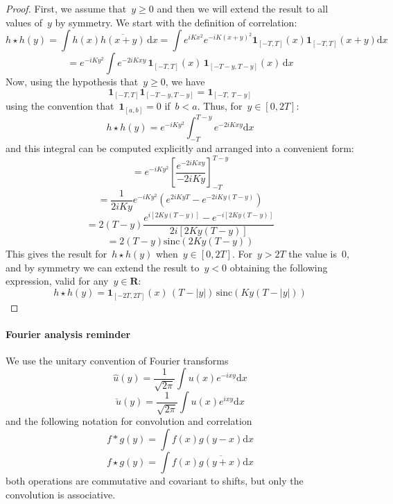 \documentclass[a4paper]{article}           %
\newcommand{\1}{\mathbf{1}}
\newcommand{\R}{\mathbf{R}}
\newcommand{\ud}{\mathrm{d}}
\newcommand{\abs}[1]{\left|#1\right|}
\newcommand{\paren}[1]{\left(#1\right)}
\begin{document}
\begin{proof}
	First, we assume that~$y\ge0$ and then we will extend the result to all
	values of~$y$ by symmetry.  We start with the definition of correlation:
	\[
		h\star h (y)
		=
		\int
		h(x)\overline{h(x+y)}\,\ud x
		=
		\int
		e^{iKx^2}
		e^{-iK\paren{x+y}^2}
		\1_{[-T,T]} (x)
		\1_{[-T,T]} (x+y)
		\ud x
	\]
	\[
		=
		e^{-iKy^2}
		\int
		e^{-2iKxy}
		\,
		\1_{[-T,T]} (x)
		\,
		\1_{[-T-y,T-y]} (x)
		\,
		\ud x
	\]
	Now, using the hypothesis that~$y\ge0$, we have
	\[
		\1_{[-T,T]} \1_{[-T-y,T-y]}
		=
		\1_{[-T,\ T-y]}
	\]
	using the convention that~$\1_{[a,b]}=0$ if~$b<a$.
	Thus, for~$y\in[0,2T]$:
	\[
		h\star h (y)
		=
		e^{-iKy^2}
		\int_{-T}^{T-y}
		e^{-2iKxy}
		\ud x
	\]
	and this integral can be computed explicitly and arranged into a convenient
	form:
	\[
		=
		e^{-iKy^2}
		\left[
			\frac{\displaystyle e^{-2iKxy}}{-2iKy}
		\right]_{-T}^{T-y}
	\]
	\[
		=
		\frac{1}{2iKy}
		e^{-iKy^2}
		\paren{
			e^{2iKyT}-e^{-2iKy(T-y)}
		}
	\]
	\[
		=
		2\paren{T-y}
		\frac{
			e^{i\left[2Ky\paren{T-y}\right]}-e^{-i\left[2Ky\paren{T-y}\right]}
			}{
				2i\left[2Ky\paren{T-y}\right]
		}
	\]
	\[
		=
		2\paren{T-y}\mathrm{sinc}\paren{2Ky\paren{T-y}}
	\]
	This gives the result for~$h\star h(y)$ when~$y\in[0,2T]$.  For~$y>2T$ the
	value is~$0$, and by symmetry we can extend the result to~$y<0$ obtaining
	the following expression, valid for any~$y\in\R$:
	\[
		h\star h(y)=\1_{[-2T,2T]}(x)\,\paren{T-\abs{y}}
		\,
		\mathrm{sinc}\paren{ Ky\paren{T-\abs{y}} }
	\]
\end{proof}



\clearpage
\paragraph{Fourier analysis reminder}

We use the unitary convention of Fourier transforms
$$ \hat{u}(y)=\frac{1}{\sqrt{2\pi}}\int u(x)e^{-ixy}\ud x $$
$$ \check{u}(y)=\frac{1}{\sqrt{2\pi}}\int u(x)e^{ixy}\ud x $$
and the following notation for convolution and correlation
$$ f*g(y)=\int f(x)g(y-x)\ud x $$
$$ f\star g(y)=\int f(x)\overline{g(y+x)}\ud x $$
both operations are commutative and covariant to shifts, but only the
convolution is associative.
\end{document}

